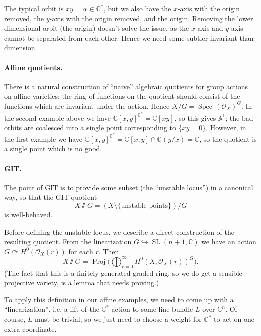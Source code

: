 \documentclass{article}
\theoremstyle{definition}
\DeclareMathOperator{\Spec}{Spec}
\DeclareMathOperator{\Proj}{Proj}
\DeclareMathOperator{\SL}{SL}
\renewcommand{\O}{\mathcal{O}}
\newcommand{\A}{\mathbb{A}}
\newcommand{\C}{\mathbb{C}}
\begin{document}
The typical orbit is $xy=\alpha\in\C^*$, but we also have the $x$-axis with the
origin removed, the $y$-axis with the origin removed, and the origin. Removing
the lower dimensional orbit (the origin) doesn't solve the issue, as the
$x$-axis and $y$-axis cannot be separated from each other. Hence we need some
subtler invariant than dimension.

\paragraph{Affine quotients.} There is a natural construction of ``naive''
algebraic quotients for group actions on affine varieties: the ring of functions
on the quotient should consist of the functions which are invariant under the
action. Hence $X/G=\Spec\,(\O_X)^G$. In the second example above we have
$\C[x,y]^{\C^*}=\C[xy]$, so this gives $\A^1$; the bad orbits are coalesced into
a single point corresponding to $\{xy=0\}$. However, in the first example we
have $\C[x,y]^{\C^*}=\C[x,y]\cap\C(y/x)=\C$, so the quotient is a single point
which is no good.

\paragraph{GIT.} The point of GIT is to provide some subset (the ``unstable
locus'') in a canonical way, so that the GIT quotient
\begin{equation*}
    X\sslash G = (X\setminus\{\text{unstable points}\})/G
\end{equation*}
is well-behaved.

Before defining the unstable locus, we describe a direct construction of the
resulting quotient. From the linearization $G\hookrightarrow\SL(n+1,\C)$ we have
an action $G\curvearrowright H^0(\O_X(r))$ for each $r$. Then
\begin{equation*}
X\sslash G = \Proj\biggl(\bigoplus_{r=0}^\infty H^0(X,\O_X(r))^G\biggr).
\end{equation*}
(The fact that this is a finitely-generated graded ring, so we do get a sensible
projective variety, is a lemma that needs proving.)

To apply this definition in our affine examples, we need to come up with a
``linearization'', i.e. a lift of the $\C^*$ action to some line bundle $L$ over
$\C^n$. Of course, $L$ must be trivial, so we just need to choose a weight for
$\C^*$ to act on one extra coordinate.
\end{document}

